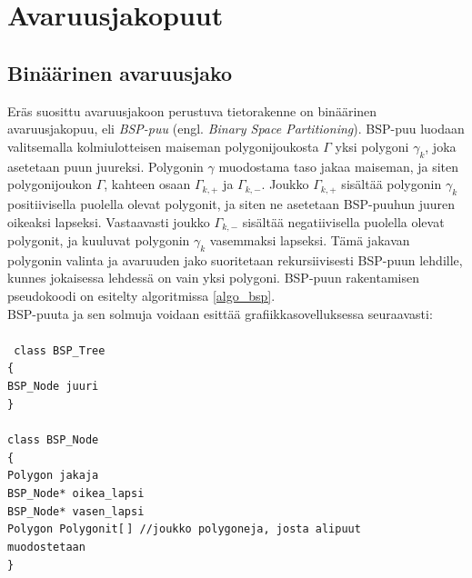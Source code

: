 ﻿\documentclass[a4paper,12pt, titlepage]{article}
\newcommand{\tab}[1][0.5cm]{\hspace*{#1}} %
\newcommand{\code}[1]{\small\texttt{#1}} %
\begin{document}
\newpage
\section{Avaruusjakopuut}
\subsection{Binäärinen avaruusjako}

Eräs suosittu avaruusjakoon perustuva tietorakenne on binäärinen avaruusjakopuu, eli \emph{BSP-puu} (engl. \emph{Binary Space Partitioning}). BSP-puu luodaan valitsemalla kolmiulotteisen maiseman  polygonijoukosta $\Gamma$ yksi polygoni $\gamma_k$, joka asetetaan puun juureksi. Polygonin $\gamma$ muodostama taso jakaa maiseman, ja siten polygonijoukon $\Gamma$, kahteen osaan $\Gamma_{k,+}$ ja $\Gamma_{k,-}$. Joukko $\Gamma_{k,+}$ sisältää polygonin $\gamma_k$ positiivisella puolella olevat polygonit, ja siten ne asetetaan BSP-puuhun juuren oikeaksi lapseksi. Vastaavasti joukko $\Gamma_{k,-}$ sisältää negatiivisella puolella olevat polygonit, ja kuuluvat polygonin $\gamma_k$ vasemmaksi lapseksi. Tämä jakavan polygonin valinta ja avaruuden jako suoritetaan rekursiivisesti BSP-puun lehdille, kunnes jokaisessa lehdessä on vain yksi polygoni. \citep[.]{samet} BSP-puun rakentamisen pseudokoodi on esitelty algoritmissa \ref{algo_bsp}.\\

BSP-puuta ja sen solmuja voidaan esittää grafiikkasovelluksessa seuraavasti:\\\\%
\code{
class BSP\_Tree\\
\{\\
\tab BSP\_Node juuri\\
\}\\\\
class BSP\_Node\\
\{\\
\tab Polygon jakaja\\
\tab BSP\_Node* oikea\_lapsi\\
\tab BSP\_Node* vasen\_lapsi\\
\tab Polygon Polygonit[$\,$] \tab //joukko polygoneja, josta alipuut\\ 
\hspace*{5.65cm} muodostetaan\\
\}\\}


\newpage
\end{document}
